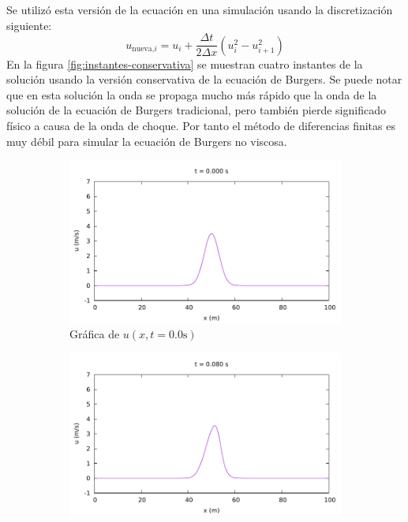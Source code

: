 \documentclass[12pt]{article}
\begin{document}
	Se utilizó esta versión de la ecuación en una simulación usando la discretización siguiente:
	\begin{equation}
		u_{\text{nueva,}i} = u_{i} + \frac{\Delta t}{2\Delta x}(u_{i}^{2}-u_{i+1}^{2}) 
		\label{eq:burgers-conserv-discreta}
	\end{equation}
	En la figura \ref{fig:instantes-conservativa} se muestran cuatro instantes de la solución usando la versión conservativa de la ecuación de Burgers. Se puede notar que en esta solución la onda se propaga mucho más rápido que la onda de la solución de la ecuación de Burgers tradicional, pero también pierde significado físico a causa de la onda de choque. Por tanto el método de diferencias finitas es muy débil para simular la ecuación de Burgers no viscosa.

	\begin{figure}[ht]
		\centering
		\begin{subfigure}[b]{0.4\textwidth}
			\includegraphics[width=\textwidth]{../burgers1DDF/resultados-conservativa/frame000.pdf}
			\caption*{Gráfica de $u(x,t=0.0\unit{\second})$}
			\label{fig:image1}
		\end{subfigure}
		\hfill
		\begin{subfigure}[b]{0.4\textwidth}
			\includegraphics[width=\textwidth]{../burgers1DDF/resultados-conservativa/frame016.pdf}

\end{subfigure}
\end{figure}
\end{document}

